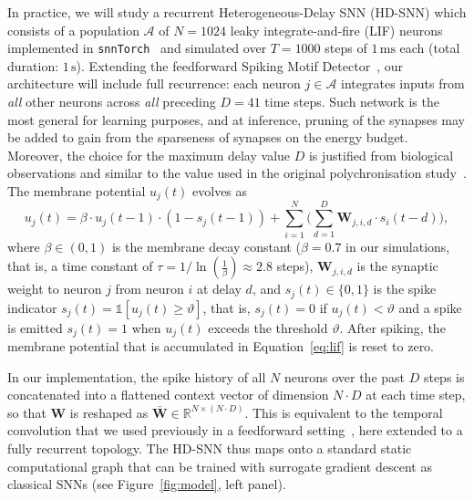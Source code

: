 \documentclass{scrartcl}
\newcommand{\citep}[1]{\parencite{#1}}
\begin{document}
In practice, we will study a recurrent Heterogeneous-Delay SNN (HD-SNN) which consists of a population $\mathcal{A}$ of $N = 1024$ leaky integrate-and-fire (LIF) neurons implemented in \texttt{snnTorch}~\citep{Eshraghian2023} and simulated over $T = 1000$ steps of $1\,\mathrm{ms}$ each (total duration: $1\,\mathrm{s}$). Extending the feedforward Spiking Motif Detector~\citep{Perrinet2023}, our architecture will include full recurrence: each neuron $j \in \mathcal{A}$  integrates inputs from \emph{all} other neurons across \emph{all} preceding $D = 41$ time steps. Such network is the most general for learning purposes, and at inference, pruning of the synapses may be added to gain from the sparseness of synapses on the energy budget. Moreover, the choice for the maximum delay value $D$ is justified from biological observations and similar to the value used in the original polychronisation study~\citep{Izhikevich2006}. The membrane potential $u_j(t)$ evolves as
\begin{equation}
  u_j(t)
  = \beta \cdot u_j(t-1) \cdot (1 - s_j(t-1))
    + \sum_{i=1}^{N} \bigl (
      \sum_{d=1}^{D} \mathbf{W}_{j, i, d} \cdot s_i(t-d) \bigr ), 
  \label{eq:lif}
\end{equation}
where $\beta \in (0,1)$ is the membrane decay constant ($\beta = 0.7$ in our simulations, that is, a time constant of $\tau= 1 / \ln(\frac 1 \beta) \approx 2.8$ steps), $\mathbf{W}_{j, i, d}$ is the synaptic weight to neuron $j$ from neuron $i$ at delay $d$, and $s_j(t) \in \{0,1\}$  is the spike indicator $s_j(t) = \mathds{1}[u_j(t) \geq \vartheta]$, that is, $s_j(t)=0$ if $u_j(t) < \vartheta$ and a spike is emitted $s_j(t)=1$ when $u_j(t)$ exceeds the threshold $\vartheta$. After spiking, the membrane potential that is accumulated in Equation~\ref{eq:lif} is reset to zero.

In our implementation, the spike history of all $N$ neurons over the past $D$ steps is concatenated into a flattened context vector of dimension $N \cdot D$ at each time step, so that $\mathbf{W}$ is reshaped as $\mathbf{\bar W} \in \mathbb{R}^{N \times (N \cdot D)}$. This is equivalent to the temporal convolution that we used previously in a feedforward setting~\citep{Perrinet2023}, here extended to a fully recurrent topology. The HD-SNN thus maps onto a standard static computational graph that can be trained with surrogate gradient descent as classical SNNs (see Figure~\ref{fig:model}, left panel).

\end{document}
